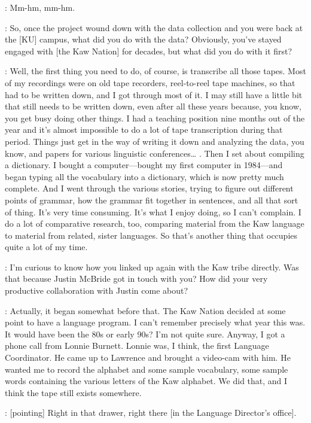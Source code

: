 \documentclass[output=paper]{LSP/langsci}
\begin{document}
: Mm-hm, mm-hm.

: So, once the project wound down with the data collection and you were back at the [KU] campus, what did you do with the data? Obviously, you've stayed engaged with [the Kaw Nation] for decades, but what did you do with it first?

: Well, the first thing you need to do, of course, is transcribe all those tapes. Most of my recordings were on old tape recorders, reel-to-reel tape machines, so that had to be written down, and I got through most of it. I may still have a little bit that still needs to be written down, even after all these years because, you know, you get busy doing other things. I had a teaching position nine months out of the year and it's almost impossible to do a lot of tape transcription during that period. Things just get in the way of writing it down and analyzing the data, you know, and papers for various linguistic conferences{\ldots} . Then I set about compiling a dictionary. I bought a computer---bought my first computer in 1984---and began typing all the vocabulary into a dictionary, which is now pretty much complete. And I went through the various stories, trying to figure out different points of grammar, how the grammar fit together in sentences, and all that sort of thing. It's very time consuming. It's what I enjoy doing, so I can't complain. I do a lot of comparative research, too, comparing material from the Kaw language to material from related, sister languages. So that's another thing that occupies quite a lot of my time.

: I'm curious to know how you linked up again with the Kaw tribe directly. Was that because Justin McBride got in touch with you? How did your very productive collaboration with Justin come about?

: Actually, it began somewhat before that. The Kaw Nation decided at some point to have a language program. I can't remember precisely what year this was. It would have been the 80s or early 90s? I'm not quite sure. Anyway, I got a phone call from Lonnie Burnett. Lonnie was, I think, the first Language Coordinator. He came up to Lawrence and brought a video-cam with him. He wanted me to record the alphabet and some sample vocabulary, some sample words containing the various letters of the Kaw alphabet. We did that, and I think the tape still exists somewhere.

: [pointing] Right in that drawer, right there [in the Language Director's office].
\end{document}
